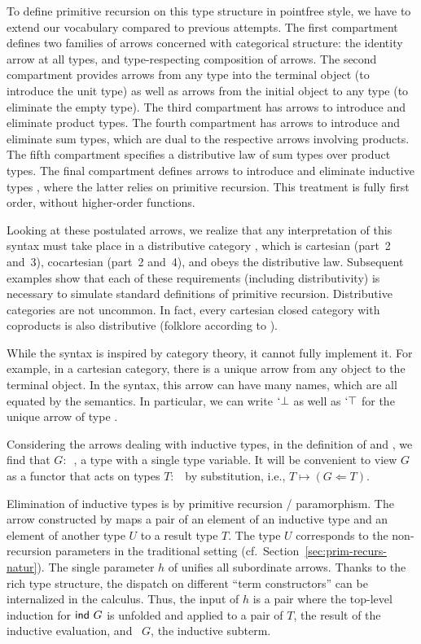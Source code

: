 \documentclass[a4paper,USenglish,cleveref, autoref, thm-restate]{lipics-v2021}
\begin{document}
To define primitive recursion on this type structure in pointfree
style, we have to extend our vocabulary compared to previous attempts.
\ccDataPR
The first compartment defines two families of arrows concerned with categorical structure: the identity arrow at all
types, and type-respecting composition of arrows.
The second compartment provides arrows from any type into the
terminal object (to introduce the unit type) as well as arrows from the
initial object to any type (to eliminate the empty type). 
The third compartment has arrows to introduce and eliminate product types.
The fourth compartment has arrows to introduce and eliminate sum types, which are dual to
the respective arrows involving products.
The fifth compartment specifies a distributive law of sum types over product types.
The final compartment
defines arrows to introduce {\Afold} and eliminate inductive types
{\AP}, where the latter relies on primitive recursion. This treatment
is fully first order, without higher-order functions.

Looking at these postulated arrows, we realize that any interpretation
of this syntax must take place in a distributive category
\cite{cockett_1993}, which is  cartesian (part~2 and~3), cocartesian
(part~2 and~4), and obeys the distributive law. Subsequent examples show
that each of these requirements (including distributivity) is
necessary to simulate standard definitions of primitive recursion. 
Distributive categories are not uncommon. In fact, every cartesian
closed category with coproducts is also distributive (folklore
according to \cite{https://doi.org/10.48550/arxiv.1406.0961}).

While the syntax is inspired by category theory, it cannot fully
implement it. For example, in a cartesian category, there is a unique
arrow from any object to the terminal object. In the syntax, this arrow
can have many names, which are all equated by the semantics. In
particular, we can write $`\bot$ as well as $`\top$ for the unique arrow
of type {\ccZeroOne}.

Considering the arrows dealing with inductive types, 
in the definition of {\Afold} and {\AP}, we find that $G :$~, a type with a
single type variable. It will be convenient to view $G$ as a functor
that acts on types $T:$~{\ATY} by substitution, i.e., $T \mapsto (G
\Leftarrow T)$. 

Elimination of inductive types is by primitive recursion /
paramorphism. The arrow constructed by {\AP} maps a pair of an element
of an inductive type and an element of another type $U$ to a result type
$T$. The type $U$ corresponds to the non-recursion parameters in the
traditional setting (cf.\ Section~\ref{sec:prim-recurs-natur}). 
The single parameter $h$ of {\AP} unifies all subordinate
arrows. Thanks to the rich type structure, the dispatch on different
``term constructors'' can be internalized in the calculus. Thus, the
input of $h$ is a pair where the top-level induction for $\Aind\ G$ is
unfolded and applied to a pair of $T$, the result of the inductive
evaluation, and \Aind~$G$, the inductive subterm.
\end{document}
